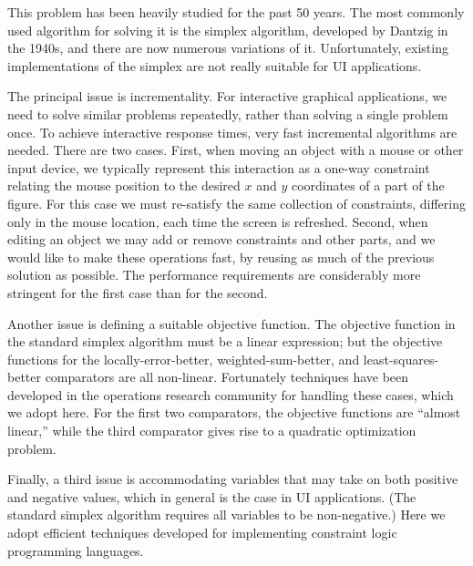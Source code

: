 \documentclass{article}
\newcommand{\ignore}[1]{}
\begin{document}
This problem has been heavily studied for the past 50 years.  The most
commonly used algorithm for solving it is the simplex algorithm, developed
by Dantzig in the 1940s, and there are now numerous variations of it. 
Unfortunately, existing implementations of the simplex
are not really suitable for UI applications.

The principal issue is incrementality.  For interactive graphical
applications, we need to solve similar problems repeatedly, rather than
solving a single problem once. To achieve interactive response times,
very fast incremental algorithms are needed.  There are two cases.  First, when
moving an object with a mouse or other input device, we typically represent
this interaction as a one-way constraint relating the mouse position to the
desired $x$ and $y$ coordinates of a part of the figure.  For this case we
must re-satisfy the same collection of constraints, differing only in the
mouse location, each time the screen is refreshed.  Second, when editing an
object we may add or remove constraints and other parts, and we would like
to make these operations fast, by reusing as much of the previous solution
as possible.  The performance requirements are considerably more stringent
for the first case than for the second.  
\ignore{In Sections \ref{resolving} and
\ref{quadratic} we describe how to update an existing solution rapidly
given new inputs (e.g., a new mouse position), while in Sections
\ref{adding-constraints} and \ref{removing-constraints} we describe how to
add or delete a constraint incrementally.}

Another issue is defining a suitable objective function.  The objective
function in the standard simplex algorithm must be a linear expression; but
the objective functions for the locally-error-better,
weighted-sum-better, and least-squares-better comparators are all
non-linear.  Fortunately techniques have been developed in the operations
research community for handling these cases, which we adopt here.  For the
first two comparators, the objective functions are ``almost linear,''
while the third comparator gives rise to a quadratic
optimization problem.
\ignore{leading to the quasi-linear optimization technique described in Section
\ref{quasi-linear}.  Least-squares-better results in a quadratic
optimization problem, which is solved using the technique described in
Section \ref{quadratic}. } 

Finally, a third issue is accommodating variables that may take on both
positive and negative values, which in general is the case in UI
applications.  (The standard simplex algorithm requires all variables to be
non-negative.)  Here we adopt efficient techniques developed for
implementing constraint logic programming languages.
\end{document}
